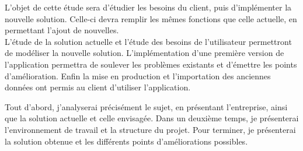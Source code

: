 L'objet de cette étude sera d'étudier les besoins du client, puis d'implémenter la nouvelle solution.
Celle-ci devra remplir les mêmes fonctions que celle actuelle, en permettant l'ajout de nouvelles.
\\



L'étude de la solution actuelle et l'étude des besoins de l'utilisateur permettront de modéliser la nouvelle solution.
L'implémentation d'une première version de l'application permettra de soulever les problèmes existants et d'émettre les points d'amélioration.
Enfin la mise en production et l'importation des anciennes données ont permis au client d'utiliser l'application.


Tout d'abord, j'analyserai précisément le sujet, en présentant l'entreprise, ainsi que la solution actuelle et celle envisagée.
Dans un deuxième temps, je présenterai l'environnement de travail et la structure du projet.
Pour terminer, je présenterai la solution obtenue et les différents points d'améliorations possibles.